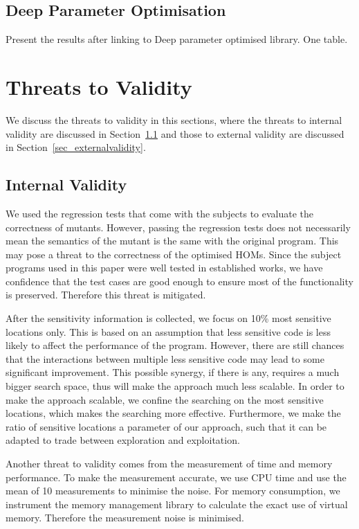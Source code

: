 \documentclass[oribibl]{llncs}
\begin{document}
\subsection{Deep Parameter Optimisation}
\label{sec_resdeep}

Present the results after linking to Deep parameter optimised library. One table.

\section{Threats to Validity}
\label{sec_threat}

We discuss the threats to validity in this sections, where the threats to internal validity are discussed in Section~\ref{sec_internalvalidity} and those to external validity are discussed in Section~\ref{sec_externalvalidity}.

\subsection{Internal Validity}
\label{sec_internalvalidity}

We used the regression tests that come with the subjects to evaluate the correctness of mutants.
However, passing the regression tests does not necessarily mean the semantics of the mutant is the same with the original program.
This may pose a threat to the correctness of the optimised HOMs.
Since the subject programs used in this paper were well tested in established works, we have confidence that the test cases are good enough to ensure most of the functionality is preserved.
Therefore this threat is mitigated.

After the sensitivity information is collected, we focus on 10\% most sensitive locations only.
This is based on an assumption that less sensitive code is less likely to affect the performance of the program.
However, there are still chances that the interactions between multiple less sensitive code may lead to some significant improvement.
This possible synergy, if there is any, requires a much bigger search space, thus will make the approach much less scalable.
In order to make the approach scalable, we confine the searching on the most sensitive locations, which makes the searching more effective.
Furthermore, we make the ratio of sensitive locations a parameter of our approach, such that it can be adapted to trade between exploration and exploitation.

Another threat to validity comes from the measurement of time and memory performance.
To make the measurement accurate, we use CPU time and use the mean of 10 measurements to minimise the noise.
For memory consumption, we instrument the memory management library to calculate the exact use of virtual memory.
Therefore the measurement noise is minimised.
\end{document}
